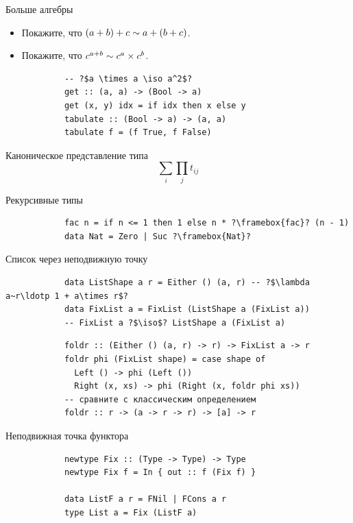     \begin{frame}[fragile]{Больше алгебры}
        \pause
        \begin{itemize}
            \item[\todo] Покажите, что $(a + b) + c \sim a + (b + c)$.
            \item[\todo] Покажите, что $c^{a + b} \sim c^a\times c^b$.
        \end{itemize}
        \pause\vspace{1em}
        \begin{verbatim}
            -- ?$a \times a \iso a^2$?
            get :: (a, a) -> (Bool -> a)
            get (x, y) idx = if idx then x else y
            tabulate :: (Bool -> a) -> (a, a)
            tabulate f = (f True, f False)
        \end{verbatim}
    \end{frame}

    \begin{frame}[fragile]{Каноническое представление типа}
        \pause
        \[
            \sum_{i}\prod_{j} t_{ij}
        \]
    \end{frame}


    \begin{frame}[fragile]{Рекурсивные типы}
        \begin{verbatim}
            fac n = if n <= 1 then 1 else n * ?\framebox{fac}? (n - 1)
            data Nat = Zero | Suc ?\framebox{Nat}?
        \end{verbatim}
    \end{frame}

    \begin{frame}[fragile]{Список через неподвижную точку}
        \pause
        \begin{verbatim}
            data ListShape a r = Either () (a, r) -- ?$\lambda a~r\ldotp 1 + a\times r$?
            data FixList a = FixList (ListShape a (FixList a))
            -- FixList a ?$\iso$? ListShape a (FixList a)
        \end{verbatim}
        \vspace{1em}
        \pause
        \begin{verbatim}
            foldr :: (Either () (a, r) -> r) -> FixList a -> r
            foldr phi (FixList shape) = case shape of
              Left () -> phi (Left ())
              Right (x, xs) -> phi (Right (x, foldr phi xs))
            -- сравните с классическим определением
            foldr :: r -> (a -> r -> r) -> [a] -> r
        \end{verbatim}
    \end{frame}

    \begin{frame}[fragile]{Неподвижная точка функтора}
        \pause
        \begin{verbatim}
            newtype Fix :: (Type -> Type) -> Type
            newtype Fix f = In { out :: f (Fix f) }

            data ListF a r = FNil | FCons a r
            type List a = Fix (ListF a)
        \end{verbatim}
    \end{frame}


